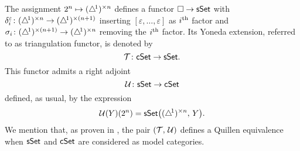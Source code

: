 The assignment $2^n \mapsto (\triangle^{\!1})^{\times n}$ defines a functor $\square \to \mathsf{sSet}$ with $\delta_i^\varepsilon \colon (\triangle^{\!1})^{\times n} \to (\triangle^{\!1})^{\times (n+1)}$ inserting $[\varepsilon, \dots, \varepsilon]$ as $i^{\mathrm{th}}$ factor and $\sigma_i \colon (\triangle^{\!1})^{\times (n+1)} \to (\triangle^{\!1})^{\times n}$ removing the $i^{\mathrm{th}}$ factor.
Its Yoneda extension, referred to as triangulation functor, is denoted by
\[
\operatorname{\mathcal{T}} \colon \mathsf{cSet} \to \mathsf{sSet}.
\]
This functor admits a right adjoint
\[
\operatorname{\mathcal{U}} \colon \mathsf{sSet} \to \mathsf{cSet}
\]
defined, as usual, by the expression
\[
\operatorname{\mathcal{U}}(Y)(2^n) = \mathsf{sSet} \big( (\triangle^{\!1})^{\times n}, \, Y \big).
\]
We mention that, as proven in \cite[\S~8.4.30]{cisinski2006presheaves}, the pair $(\operatorname{\mathcal{T}},\, \operatorname{\mathcal{U}})$ defines a Quillen equivalence when $\mathsf{sSet}$ and $\mathsf{cSet}$ are considered as model categories.

%
%
%
%

%

